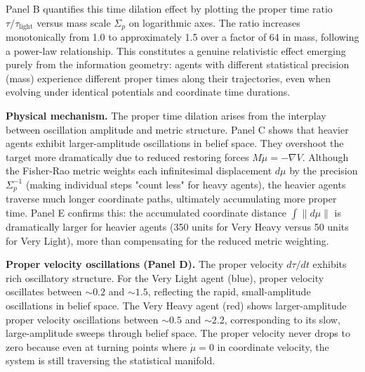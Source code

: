 \documentclass[11pt]{article}
\begin{document}
Panel B quantifies this time dilation effect by plotting the proper time ratio $\tau/\tau_{\text{light}}$ versus mass scale $\Sigma_p$ on logarithmic axes. The ratio increases monotonically from 1.0 to approximately 1.5 over a factor of 64 in mass, following a power-law relationship. This constitutes a genuine relativistic effect emerging purely from the information geometry: agents with different statistical precision (mass) experience different proper times along their trajectories, even when evolving under identical potentials and coordinate time durations.

\textbf{Physical mechanism.} The proper time dilation arises from the interplay between oscillation amplitude and metric structure. Panel C shows that heavier agents exhibit larger-amplitude oscillations in belief space. They overshoot the target more dramatically due to reduced restoring forces $M\ddot{\mu} = -\nabla V$. Although the Fisher-Rao metric weights each infinitesimal displacement $d\mu$ by the precision $\Sigma_p^{-1}$ (making individual steps "count less" for heavy agents), the heavier agents traverse much longer coordinate paths, ultimately accumulating more proper time. Panel E confirms this: the accumulated coordinate distance $\int \|d\mu\|$ is dramatically larger for heavier agents (350 units for Very Heavy versus 50 units for Very Light), more than compensating for the reduced metric weighting.

\textbf{Proper velocity oscillations (Panel D).} The proper velocity $d\tau/dt$ exhibits rich oscillatory structure. For the Very Light agent (blue), proper velocity oscillates between $\sim 0.2$ and $\sim 1.5$, reflecting the rapid, small-amplitude oscillations in belief space. The Very Heavy agent (red) shows larger-amplitude proper velocity oscillations between $\sim 0.5$ and $\sim 2.2$, corresponding to its slow, large-amplitude sweeps through belief space. The proper velocity never drops to zero because even at turning points where $\dot{\mu} = 0$ in coordinate velocity, the system is still traversing the statistical manifold.
\end{document}

